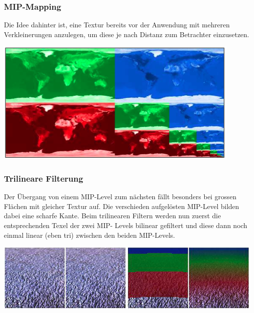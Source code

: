 \documentclass[10pt]{article}
\begin{document}
\subsubsection{MIP-Mapping}
Die Idee dahinter ist, eine Textur bereits vor der Anwendung mit mehreren Verkleinerungen anzulegen, um diese je nach Distanz zum Betrachter einzusetzen.
\begin{center}
	\includegraphics[scale=0.4]{mip-mapping.png}
\end{center}
\subsubsection{Trilineare Filterung}
Der Übergang von einem MIP-Level zum nächsten fällt besonders bei grossen Flächen mit gleicher Textur auf. Die verschieden aufgelösten MIP-Level bilden dabei eine scharfe Kante. Beim trilinearen Filtern werden nun zuerst die entsprechenden Texel der zwei MIP- Levels bilinear gefiltert und diese dann noch einmal linear (eben tri) zwischen den beiden MIP-Levels.
\begin{center}
	\includegraphics[scale=0.4]{trilineare_filtering.png}
\end{center}
\end{document}
